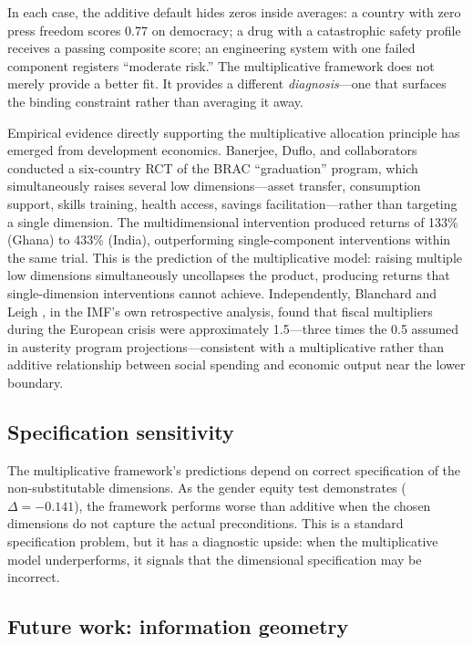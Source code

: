 \documentclass[12pt, a4paper]{article}
\theoremstyle{definition}
\theoremstyle{remark}
\begin{document}
In each case, the additive default hides zeros inside averages: a country with zero press freedom scores 0.77 on democracy; a drug with a catastrophic safety profile receives a passing composite score; an engineering system with one failed component registers ``moderate risk.'' The multiplicative framework does not merely provide a better fit. It provides a different \textit{diagnosis}---one that surfaces the binding constraint rather than averaging it away.

Empirical evidence directly supporting the multiplicative allocation principle has emerged from development economics. Banerjee, Duflo, and collaborators \cite{banerjee2015} conducted a six-country RCT of the BRAC ``graduation'' program, which simultaneously raises several low dimensions---asset transfer, consumption support, skills training, health access, savings facilitation---rather than targeting a single dimension. The multidimensional intervention produced returns of 133\% (Ghana) to 433\% (India), outperforming single-component interventions within the same trial. This is the prediction of the multiplicative model: raising multiple low dimensions simultaneously uncollapses the product, producing returns that single-dimension interventions cannot achieve. Independently, Blanchard and Leigh \cite{blanchard2013}, in the IMF's own retrospective analysis, found that fiscal multipliers during the European crisis were approximately 1.5---three times the 0.5 assumed in austerity program projections---consistent with a multiplicative rather than additive relationship between social spending and economic output near the lower boundary.

\subsection{Specification sensitivity}

The multiplicative framework's predictions depend on correct specification of the non-substitutable dimensions. As the gender equity test demonstrates ($\Delta = -0.141$), the framework performs worse than additive when the chosen dimensions do not capture the actual preconditions. This is a standard specification problem, but it has a diagnostic upside: when the multiplicative model underperforms, it signals that the dimensional specification may be incorrect.

\subsection{Future work: information geometry}
\end{document}
